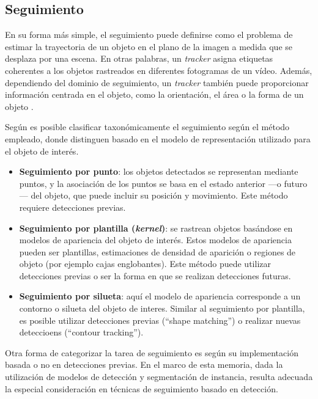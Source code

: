 \subsection{Seguimiento}
En su forma más simple, el seguimiento puede definirse como el problema de estimar la trayectoria de un objeto en el plano de la imagen a medida que se desplaza por una escena. En otras palabras, un \textit{tracker} asigna etiquetas coherentes a los objetos rastreados en diferentes fotogramas de un vídeo. Además, dependiendo del dominio de seguimiento, un \textit{tracker} también puede proporcionar información centrada en el objeto, como la orientación, el área o la forma de un objeto \cite{Yilmaz2006}.

Según \cite[Yilmaz et al.]{Yilmaz2006} es posible clasificar taxonómicamente el seguimiento según el método empleado, donde distinguen basado en el modelo de representación utilizado para el objeto de interés.

\begin{itemize}
    \item \textbf{Seguimiento por punto}: los objetos detectados se representan mediante puntos, y la asociación de los puntos se basa en el estado anterior ---o futuro--- del objeto, que puede incluir su posición y movimiento. Este método requiere detecciones previas.
    \item \textbf{Seguimiento por plantilla (\textit{kernel})}: se rastrean objetos basándose en modelos de apariencia del objeto de interés. Estos modelos de apariencia pueden ser plantillas, estimaciones de densidad de aparición o regiones de objeto (por ejemplo cajas englobantes). Este método puede utilizar detecciones previas o ser la forma en que se realizan detecciones futuras.
    \item \textbf{Seguimiento por silueta}: aquí el modelo de apariencia corresponde a un contorno o silueta del objeto de interes. Similar al seguimiento por plantilla, es posible utilizar detecciones previas (``shape matching'') o realizar nuevas deteccioens (``contour tracking'').
\end{itemize}

Otra forma de categorizar la tarea de seguimiento es según su implementación basada o no en detecciones previas. En el marco de esta memoria, dada la utilización de modelos de detección y segmentación de instancia, resulta adecuada la especial consideración en técnicas de seguimiento basado en detección.

